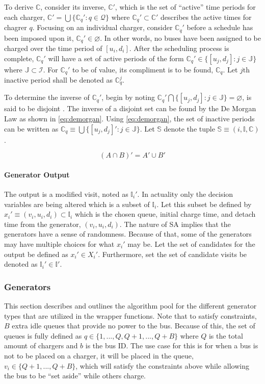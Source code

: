 \documentclass[11pt,a4paper,final]{article}
\newcommand{\I}{\mathbb{I}}                 %
\newcommand{\C}{\mathbb{C}}                 %
\newcommand{\Sol}{\mathbb{S}}               %
\newcommand{\Jsetq}{\mathbb{J}}             %
\begin{document}
To derive \(\C\), consider its inverse, \(\C'\), which is the set of ``active'' time periods for each charger, \(\C' = \bigcup
\{\C_q' : q \in \mathcal{Q}\}\) where \(\C_q' \subset \C'\) describes the active times for chagrer \(q\). Focusing on an individual charger,
consider \(\C_q'\) before a schedule has been imposed upon it, \(\C_q' \in \varnothing\). In other words, no buses have been
assigned to be charged over the time period of \([u_i, d_i]\). After the scheduling process is complete, \(\C_q'\) will have
a set of active periods of the form \(\C_q' \in \{[u_j, d_j]: j \in \Jsetq \}\) where \(\Jsetq \subset \mathcal{I}\). For \(\C_q'\) to be of
value, its compliment is to be found, \(\C_q\). Let \(j\text{th}\) inactive period shall be denoted as \(\C^j_q\).

To determine the inverse of \(\C_q'\), begin by noting \(\C_q' \bigcap \{[u_j, d_j] : j \in \Jsetq\} = \varnothing\), is said to be
disjoint \cite{halmos-1974-naive-set-theor}. The inverse of a disjoint set can be found by the De Morgan Law as shown
in \ref{eq:demorgan}. Using \ref{eq:demorgan}, the set of inactive periods can be written as \(\C_q \equiv \bigcup \{[u_j, d_j]': j \in \Jsetq\}\).
Let \(\Sol\) denote the tuple \(\Sol \equiv (i, \I, \C)\).

\begin{equation}
\label{eq:demorgan}
(A \cap B)' = A' \cup B'
\end{equation}

\paragraph{Generator Output}
\label{sec:orgfed40c9}
The output is a modified visit, noted as \(\I_i'\). In actuality only the decision variables are being altered which is a
subset of \(\I_i\). Let this subset be defined by \(x_i' \equiv (v_i, u_i, d_i) \subset \I_i\) which is the chosen queue, initial
charge time, and detach time from the generator, \((v_i, u_i, d_i)\). The nature of SA implies that the generators have a
sense of randomness. Because of that, some of the generators may have multiple choices for what \(x_i'\) may be. Let the
set of candidates for the output be defined as \(x_i' \in X_i'\). Furthermore, set the set of candidate visits be denoted as
\(\I_i' \in \I'\).

\subsubsection{Generators}
\label{sec:generators}
This section describes and outlines the algorithm pool for the different generator types that are utilized in the
wrapper functions. Note that to satisfy constraints, \(B\) extra idle queues that provide no power to the bus. Because of
this, the set of queues is fully defined as \(q \in \{1,..., Q, Q+1,..., Q+B\}\) where \(Q\) is the total amount of chargers
and \(b\) is the bus ID. The use case for this is for when a bus is not to be placed on a charger, it will be placed in
the queue, \(v_i \in \{Q+1,..., Q+B\}\), which will satisfy the constraints above while allowing the bus to be ``set aside''
while others charge.
\end{document}
